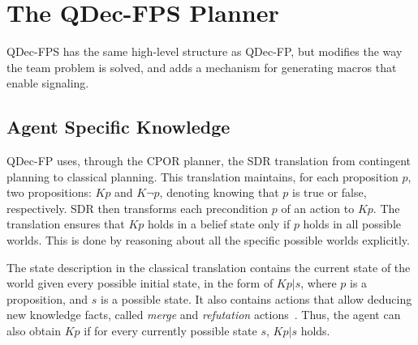 \documentclass[letterpaper]{article} %
\theoremstyle{definition}
\begin{document}
\section{The QDec-FPS Planner} 
%
QDec-FPS 
has the
same high-level structure as QDec-FP, but modifies the way the team problem is solved, and adds a %
mechanism for generating macros that enable signaling. 


\subsection{Agent Specific Knowledge}


QDec-FP uses, through the CPOR planner, the SDR translation from contingent planning to classical planning. This translation maintains, for each proposition $p$, two propositions: $Kp$ and $K\neg p$, denoting knowing that $p$ is true or false, respectively.
SDR then transforms each precondition $p$ of an action to $Kp$.
%
The translation ensures that $Kp$ holds in a belief state only if $p$ holds in all possible worlds.
This is done by reasoning about all the specific possible worlds explicitly. 

The state description in the classical translation contains the current state of the world given every possible initial state, in the form of $Kp|s$, where $p$ is a proposition, and $s$ is a possible state. It also contains actions that allow deducing new knowledge facts, called {\em merge} and {\em refutation} actions~\citep{PalaciosG09}. Thus, the agent can also obtain $Kp$ if for every currently possible state $s$, $Kp|s$ holds.
\end{document}

